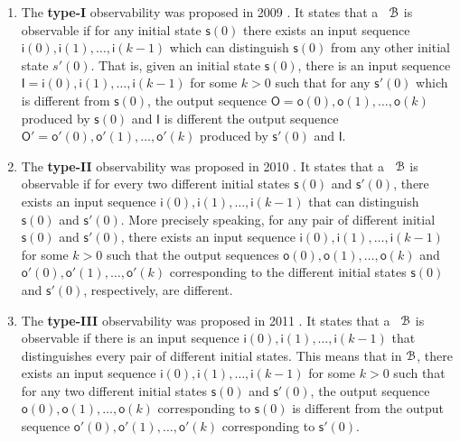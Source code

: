 \begin{enumerate}
\item The  {\bf type-I}  observability was proposed in 2009 \cite{cheng2009controllability}. It states that a \BCN\ ${\mathcal{B}}$ is observable if for any initial state   $\mathsf{s}(0)$ there exists an input sequence  $\mathsf{i}(0),\mathsf{i}(1),\ldots,\mathsf{i}(k-1)$ which can  distinguish $\mathsf{s}(0)$ from any other initial state $s'(0)$. That is,  given an initial state $\mathsf{s}(0)$, there is an input sequence $\mathsf{I}=\mathsf{i}(0),\mathsf{i}(1),\ldots,\mathsf{i}(k-1)$ for some $k>0$ such that  for any  $\mathsf{s}'(0)$ which is different from $\mathsf{s}(0)$, the output sequence  $\mathsf{O}=\mathsf{o}(0),\mathsf{o}(1),\ldots,\mathsf{o}(k)$ produced by  $\mathsf{s}(0)$ and $\mathsf{I}$ is different the output sequence  $\mathsf{O}'=\mathsf{o}'(0),\mathsf{o}'(1),\ldots, \mathsf{o}'(k)$ produced by  $\mathsf{s}'(0)$ and $\mathsf{I}$.

\item The  {\bf type-II} observability was proposed in 2010 \cite{Zhao2010Input}. It states that a \BCN\ ${\mathcal{B}}$ is observable if for every two different initial states $\mathsf{s}(0)$ and $\mathsf{s}'(0)$, there exists an input sequence $\mathsf{i}(0),\mathsf{i}(1),\ldots, \mathsf{i}(k-1)$ that can distinguish $\mathsf{s}(0)$ and $\mathsf{s}'(0)$. More precisely speaking,  for any pair of different initial  $\mathsf{s}(0)$ and $\mathsf{s}'(0)$, 
there exists an input sequence  $\mathsf{i}(0),\mathsf{i}(1),\ldots,\mathsf{i}(k-1)$ for some $k>0$ such that the output sequences $\mathsf{o}(0),\mathsf{o}(1),\ldots,\mathsf{o}(k)$ and  $\mathsf{o}'(0),\mathsf{o}'(1),\ldots,\mathsf{o}'(k)$ corresponding to  the different initial states  $\mathsf{s}(0)$ and $\mathsf{s}'(0)$, respectively, are different.
	
\item The  {\bf type-III} observability was proposed in 2011 \cite{Cheng2011Identification}.  It states that a \BCN\ ${\mathcal{B}}$ is observable if there is an input sequence $\mathsf{i}(0),\mathsf{i}(1),\ldots, \mathsf{i}(k-1)$ that distinguishes every pair of different initial states. This means that in ${\mathcal{B}}$, there exists an input sequence  $\mathsf{i}(0),\mathsf{i}(1), \ldots,\mathsf{i}(k-1)$ for some $k>0$ such that for any two different initial states $\mathsf{s}(0)$ and $\mathsf{s}'(0)$, the output sequence $\mathsf{o}(0),\mathsf{o}(1), \ldots, \mathsf{o}(k)$  corresponding to  $\mathsf{s}(0)$  is different from the output sequence  $\mathsf{o}'(0),\mathsf{o}'(1),\ldots, \mathsf{o}'(k)$ corresponding to $\mathsf{s}'(0)$.
	

\end{enumerate}
